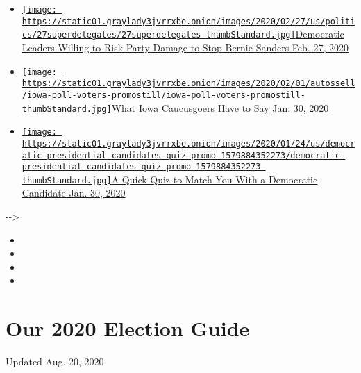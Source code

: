 \begin{itemize}
\tightlist
\item
  \href{https://www.nytimes3xbfgragh.onion/2020/02/27/us/politics/democratic-superdelegates.html}{\texttt{[image: https://static01.graylady3jvrrxbe.onion/images/2020/02/27/us/politics/27superdelegates/27superdelegates-thumbStandard.jpg]}Democratic
  Leaders Willing to Risk Party Damage to Stop Bernie Sanders Feb. 27,
  2020}
\item
  \href{https://www.nytimes3xbfgragh.onion/interactive/2020/01/30/us/politics/iowa-poll-voters.html}{\texttt{[image: https://static01.graylady3jvrrxbe.onion/images/2020/02/01/autossell/iowa-poll-voters-promostill/iowa-poll-voters-promostill-thumbStandard.jpg]}What
  Iowa Caucusgoers Have to Say Jan. 30, 2020}
\item
  \href{https://www.nytimes3xbfgragh.onion/interactive/2020/01/30/us/politics/democratic-presidential-candidates-quiz.html}{\texttt{[image: https://static01.graylady3jvrrxbe.onion/images/2020/01/24/us/democratic-presidential-candidates-quiz-promo-1579884352273/democratic-presidential-candidates-quiz-promo-1579884352273-thumbStandard.jpg]}A
  Quick Quiz to Match You With a Democratic Candidate Jan. 30, 2020}
\end{itemize}

-\/-\textgreater{}

\begin{itemize}
\item
\item
\item
\item
\end{itemize}

\hypertarget{our-2020-election-guide}{%
\section{Our 2020 Election Guide}\label{our-2020-election-guide}}

Updated Aug. 20, 2020

